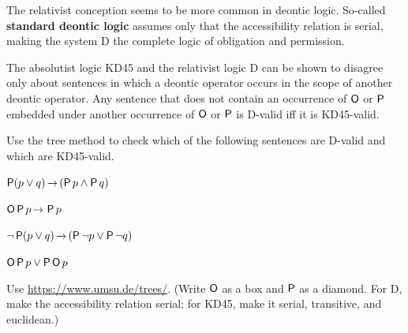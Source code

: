 The relativist conception seems to be more common in deontic logic. So-called
\textbf{standard deontic logic} assumes only that the accessibility relation is
serial, making the system D the complete logic of obligation and permission.

The absolutist logic KD45 and the relativist logic D can be shown to disagree
only about sentences in which a deontic operator occurs in the scope of another
deontic operator. Any sentence that does not contain an occurrence of $\operatorname{\mathsf{O}}$ or $\operatorname{\mathsf{P}}$ embedded under another occurrence of $\operatorname{\mathsf{O}}$ or $\operatorname{\mathsf{P}}$ is D-valid iff it is KD45-valid.


\begin{exercise}
  Use the tree method to check which of the following sentences are D-valid and
  which are KD45-valid.
  \begin{exlist}
    \item $\Pe (p \lor q) \to (\Pe p \land \Pe q)$
    \item $\Ob\Pe p \to \Pe p$
    \item $\neg\Pe(p \lor q) \to (\Pe \neg p \lor \Pe\neg q)$
    \item $\operatorname{\mathsf{O}}\operatorname{\mathsf{P}} p \lor \operatorname{\mathsf{P}}\operatorname{\mathsf{O}} p$
  \end{exlist}
\end{exercise}
\begin{solution}
  Use
  \href{https://www.umsu.de/trees/}{https://www.umsu.de/trees/}.
  (Write $\operatorname{\mathsf{O}}$ as a box and $\operatorname{\mathsf{P}}$ as a diamond. For D, make the accessibility
  relation serial; for KD45, make it serial, transitive, and euclidean.)
\end{solution}

